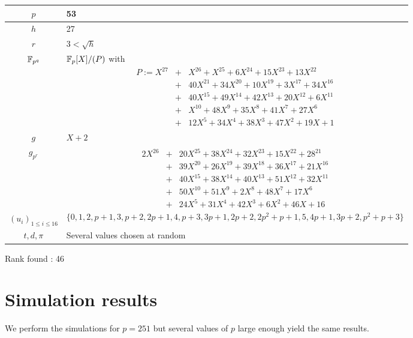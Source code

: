 \documentclass[a4paper]{article}
\newcommand{\GF}[1]{\F_{#1}}
\begin{document}
\begin{center}
\begin{tabularx}{\textwidth}{|c|X|} \hline
$p$ & 53  \\ \hline
$h$ & 27  \\ \hline
$r$ & $3 < \sqrt{h}$  \\ \hline
$\GF{p^q}$ & $\GF{p}[X] / (P)$ with
\begin{eqnarray*}
P := X^{27} &+& X^{26} + X^{25} + 6X^{24} + 15X^{23} + 13X^{22} \\
&+& 40X^{21} + 34X^{20} + 10X^{19} + 3X^{17} + 34X^{16}\\
&+& 40X^{15} + 49X^{14} + 42X^{13} + 20X^{12} + 6X^{11} \\
&+& X^{10} + 48X^9 + 35X^8 + 41X^7 + 27X^6 \\
&+& 12X^5 + 34X^4 + 38X^3 + 47X^2 + 19X + 1
\end{eqnarray*} \\ \hline
$g$ & $X+2$ \\ \hline
$g_{p^r}$ &  \begin{eqnarray*}
2X^{26} &+& 20X^{25} + 38X^{24} + 32X^{23} + 15X^{22} + 28^{21} \\
&+& 39X^{20} + 26X^{19} + 39X^{18} + 36X^{17} + 21X^{16}\\
&+& 40X^{15} + 38X^{14} + 40X^{13} + 51X^{12} + 32X^{11} \\
&+& 50X^{10} + 51X^9 + 2X^8 + 48X^7 + 17X^6 \\
&+& 24X^5 + 31X^4 + 42X^3 + 6X^2 + 46X + 16
\end{eqnarray*} \\ \hline
$(u_i)_{1 \leq i \leq 16}$ & $$\{ 0,1,2,p+1,3,p+2,2p+1,4,p+3,3p+1,2p+2,2p^2+p+1,5,4p+1,3p+2,p^2+p+3 \} $$ \\ \hline
$t, d, \pi$ & Several values chosen at random \\ \hline
\end{tabularx}
\end{center}

Rank found : 46

\newpage
\section{Simulation results}
\label{Sim:res}

We perform the simulations for $p = 251$ but several values of $p$ large enough yield the same results.
\begin{minipage}[H]{30cm}

\end{minipage}
\end{document}
